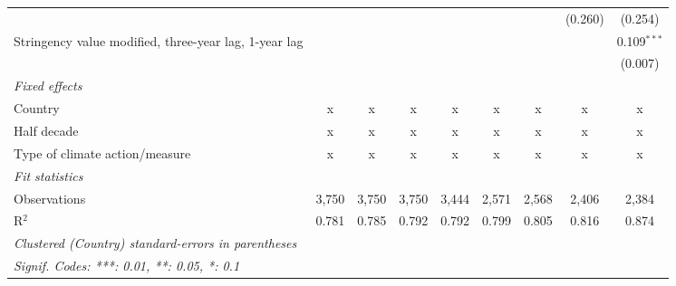 \begin{table}[htbp]
\begin{tabular}{lcccccccc}
                                                                                                 &                &               &               &               &              &               & (0.260)       & (0.254)\\   
      Stringency value modified, three-year lag, 1-year lag                                      &                &               &               &               &              &               &               & 0.109$^{***}$\\   
                                                                                                 &                &               &               &               &              &               &               & (0.007)\\   
      \emph{Fixed effects}\\
      Country                                                                                    & x              & x             & x             & x             & x            & x             & x             & x\\  
      Half decade                                                                                & x              & x             & x             & x             & x            & x             & x             & x\\  
      Type of climate action/measure                                                             & x              & x             & x             & x             & x            & x             & x             & x\\  
      \midrule \emph{Fit statistics}\\
      Observations                                                                               & 3,750          & 3,750         & 3,750         & 3,444         & 2,571        & 2,568         & 2,406         & 2,384\\  
      R$^2$                                                                                      & 0.781          & 0.785         & 0.792         & 0.792         & 0.799        & 0.805         & 0.816         & 0.874\\  
      \midrule
      \multicolumn{9}{l}{\emph{Clustered (Country) standard-errors in parentheses}}\\
      \multicolumn{9}{l}{\emph{Signif. Codes: ***: 0.01, **: 0.05, *: 0.1}}\\
   \end{tabular}
\end{table}



